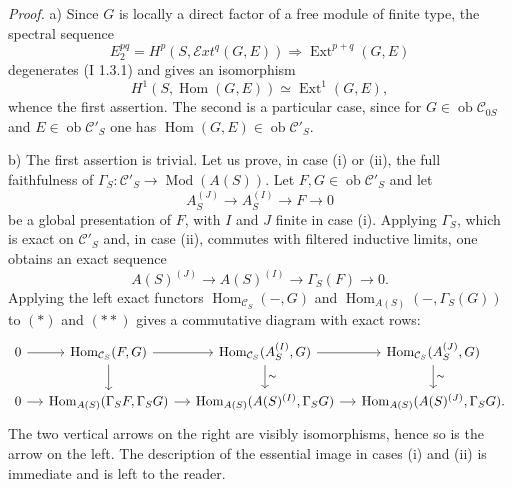 \documentclass[11pt]{article}
\providecommand{\Mod}{\operatorname{Mod}}
\providecommand{\Ext}{\operatorname{Ext}}
\providecommand{\Ob}{\operatorname{ob}}
\begin{document}
\emph{Proof.} a) Since $G$ is locally a direct factor of a free module of finite type, the spectral sequence
\[
E_2^{pq}=H^p(S,\mathcal{E}xt^q(G,E))\Longrightarrow \Ext^{p+q}(G,E)
\]
degenerates (I 1.3.1) and gives an isomorphism
\[
H^1(S,\operatorname{Hom}(G,E))\simeq \Ext^1(G,E),
\]
whence the first assertion. The second is a particular case, since for $G\in\Ob\mathcal C_{0S}$ and $E\in\Ob\mathcal C'_S$ one has $\operatorname{Hom}(G,E)\in\Ob\mathcal C'_S$.

b) The first assertion is trivial. Let us prove, in case (i) or (ii), the full faithfulness of $\Gamma_S:\mathcal C'_S\to\Mod(A(S))$. Let $F,G\in\Ob\mathcal C'_S$ and let
\[
A_S^{(J)}\longrightarrow A_S^{(I)}\longrightarrow F\longrightarrow0
\tag{$*$}
\]
be a global presentation of $F$, with $I$ and $J$ finite in case (i). Applying $\Gamma_S$, which is exact on $\mathcal C'_S$ and, in case (ii), commutes with filtered inductive limits, one obtains an exact sequence
\[
A(S)^{(J)}\longrightarrow A(S)^{(I)}\longrightarrow\Gamma_S(F)\longrightarrow0.
\tag{$**$}
\]
Applying the left exact functors $\operatorname{Hom}_{\mathcal C_S}(-,G)$ and $\operatorname{Hom}_{A(S)}(-,\Gamma_S(G))$ to $(*)$ and $(**)$ gives a commutative diagram with exact rows:
\[
\begin{tikzcd}[column sep=small]
0 \arrow[r] & \operatorname{Hom}_{\mathcal C_S}(F,G) \arrow[r] \arrow[d] &
\operatorname{Hom}_{\mathcal C_S}(A_S^{(I)},G) \arrow[r] \arrow[d,"\sim"] &
\operatorname{Hom}_{\mathcal C_S}(A_S^{(J)},G) \arrow[d,"\sim"] \\
0 \arrow[r] & \operatorname{Hom}_{A(S)}(\Gamma_SF,\Gamma_SG) \arrow[r] &
\operatorname{Hom}_{A(S)}(A(S)^{(I)},\Gamma_SG) \arrow[r] &
\operatorname{Hom}_{A(S)}(A(S)^{(J)},\Gamma_SG).
\end{tikzcd}
\]
The two vertical arrows on the right are visibly isomorphisms, hence so is the arrow on the left. The description of the essential image in cases (i) and (ii) is immediate and is left to the reader.
\end{document}

